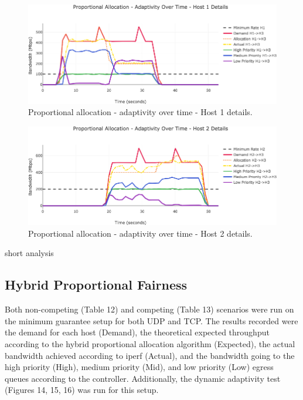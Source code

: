 \documentclass[accepted,single]{gipaper}
\begin{document}
\begin{figure}
	\centering
	\includegraphics[width=6in]{figs/dbap_ot_udp_h1.png}
	\caption{ Proportional allocation - adaptivity over time - Host 1 details. } \label{dpap_ot_h1}
\end{figure}

\begin{figure}
	\centering
	\includegraphics[width=6in]{figs/dbap_ot_udp_h2.png}
	\caption{ Proportional allocation - adaptivity over time - Host 2 details. } \label{dbap_ot_h2}
\end{figure}

short analysis

\subsection{Hybrid Proportional Fairness}
\label{dba_hybr}

Both non-competing (Table 12) and competing (Table 13) scenarios were run on the minimum guarantee setup for both UDP and TCP. The results recorded were the demand for each host (Demand), the theoretical expected throughput according to the hybrid proportional allocation algorithm (Expected), the actual bandwidth achieved according to iperf (Actual), and the bandwidth going to the high priority (High), medium priority (Mid), and low priority (Low) egress queues according to the controller. Additionally, the dynamic adaptivity test (Figures 14, 15, 16) was run for this setup.
\end{document}
